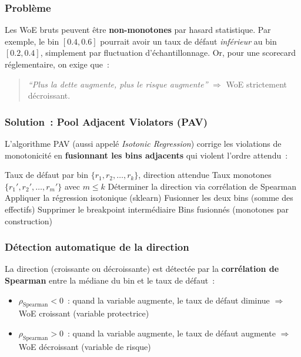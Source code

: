 \documentclass[12pt,a4paper]{article}
\begin{document}
\subsubsection{Probl\`eme}

Les WoE bruts peuvent \^etre \textbf{non-monotones} par hasard statistique. Par exemple, le bin $[0.4, 0.6]$ pourrait avoir un taux de d\'efaut \textit{inf\'erieur} au bin $[0.2, 0.4]$, simplement par fluctuation d'\'echantillonnage. Or, pour une scorecard r\'eglementaire, on exige que~:

\begin{quote}
\textit{``Plus la dette augmente, plus le risque augmente''} $\Rightarrow$ WoE strictement d\'ecroissant.
\end{quote}

\subsubsection{Solution~: Pool Adjacent Violators (PAV)}

L'algorithme PAV (aussi appel\'e \textit{Isotonic Regression}) corrige les violations de monotonicit\'e en \textbf{fusionnant les bins adjacents} qui violent l'ordre attendu~:

\begin{algorithm}[H]
\caption{Pool Adjacent Violators (PAV)}
\begin{algorithmic}[1]
\Require Taux de d\'efaut par bin $\{r_1, r_2, \ldots, r_k\}$, direction attendue
\Ensure Taux monotones $\{r_1', r_2', \ldots, r_m'\}$ avec $m \leq k$
\State D\'eterminer la direction via corr\'elation de Spearman
\State Appliquer la r\'egression isotonique (sklearn)
    \State Fusionner les deux bins (somme des effectifs)
    \State Supprimer le breakpoint interm\'ediaire
\EndFor
\State \Return Bins fusionn\'es (monotones par construction)
\end{algorithmic}
\end{algorithm}

\subsubsection{D\'etection automatique de la direction}

La direction (croissante ou d\'ecroissante) est d\'etect\'ee par la \textbf{corr\'elation de Spearman} entre la m\'ediane du bin et le taux de d\'efaut~:

\begin{itemize}[noitemsep]
    \item $\rho_{\text{Spearman}} < 0$~: quand la variable augmente, le taux de d\'efaut diminue $\Rightarrow$ WoE croissant (variable protectrice)
    \item $\rho_{\text{Spearman}} > 0$~: quand la variable augmente, le taux de d\'efaut augmente $\Rightarrow$ WoE d\'ecroissant (variable de risque)
\end{itemize}
\end{document}
